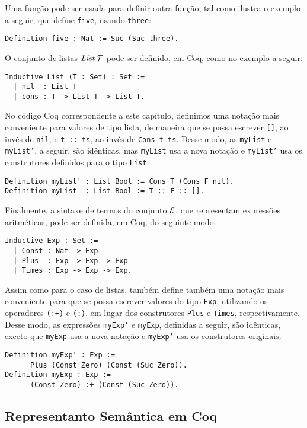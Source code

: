 Uma função pode ser usada para definir outra função, tal como ilustra o exemplo a seguir, que define \texttt{five}, usando \texttt{three}: 
\begin{lstlisting}
Definition five : Nat := Suc (Suc three).
\end{lstlisting}

O conjunto de listas $\textit{List\/}\,\mathcal{T}$ pode ser definido, em Coq, como no exemplo a seguir: 
\begin{lstlisting}
Inductive List (T : Set) : Set :=
  | nil  : List T
  | cons : T -> List T -> List T.
\end{lstlisting}

No código Coq correspondente a este capítulo, definimos uma nota\c{c}\~ao mais conveniente para valores de tipo lista, de maneira que se possa escrever \texttt{[]}, ao inv\'es de \texttt{nil}, e \texttt{t :: ts}, ao inv\'es de \texttt{Cons t ts}. Desse modo, as \texttt{myList} e \texttt{myList'}, a seguir, s\~ao id\^enticas, mas \texttt{myList} usa a nova notação e \texttt{myList'} usa os construtores definidos para o tipo \texttt{List}.
\begin{lstlisting}
Definition myList' : List Bool := Cons T (Cons F nil).
Definition myList  : List Bool := T :: F :: [].
\end{lstlisting}

Finalmente, a  sintaxe de termos do conjunto $\mathcal{E}$, que representam express\~oes aritm\'eticas, pode ser definida, em Coq, do seguinte modo:
\begin{lstlisting}
Inductive Exp : Set :=
  | Const : Nat -> Exp
  | Plus  : Exp -> Exp -> Exp
  | Times : Exp -> Exp -> Exp.
\end{lstlisting}

Assim como para o caso de listas, também define também uma notação mais conveniente para que se possa escrever valores do tipo \texttt{Exp}, utilizando os operadores \texttt{(:+)} e \texttt{(:\ast)}, em lugar dos construtores \texttt{Plus} e \texttt{Times}, respectivamente. Desse modo, as expressões \texttt{myExp'} e \texttt{myExp}, definidas a seguir, são idênticas, exceto que \texttt{myExp} usa a nova notação e \texttt{myExp'} usa os construtores originais.
\begin{lstlisting}
Definition myExp' : Exp := 
      Plus (Const Zero) (Const (Suc Zero)).
Definition myExp : Exp := 
      (Const Zero) :+ (Const (Suc Zero)).
\end{lstlisting}

\subsection{Representanto Sem\^antica em Coq}

